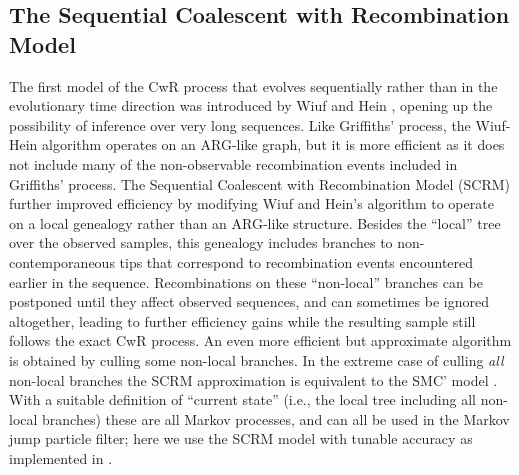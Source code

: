 \subsection{The Sequential Coalescent with Recombination Model} \label{scrm}

The first model of the CwR process that evolves sequentially rather than
in the evolutionary time direction was introduced by Wiuf and Hein \cite{C1999},
opening up the possibility of inference over very long sequences.
Like Griffiths' process, the Wiuf-Hein algorithm operates on an
ARG-like graph, but it is more efficient as it does not include many
of the non-observable recombination events included in Griffiths' process.
The Sequential Coalescent with Recombination Model (SCRM) \cite{Staab2015}
further improved efficiency by
modifying Wiuf and Hein's algorithm to operate on a local genealogy
rather than an ARG-like structure.
Besides the ``local'' tree over the observed samples, this genealogy includes
branches to non-contemporaneous tips that correspond to recombination
events encountered earlier in the sequence.  Recombinations on these
``non-local'' branches can be postponed until they affect observed sequences,
and can sometimes be ignored altogether, leading to further efficiency gains
while the resulting sample still follows the exact CwR process. An even
more efficient but approximate algorithm is obtained by culling some
non-local branches.  In the extreme case of culling \emph{all}
non-local branches the SCRM approximation is equivalent to the
SMC' model \cite{McVean2005,Marjoram2006}.
With a suitable definition of ``current state'' (i.e., the local tree
including all non-local branches) these are all Markov processes, and can all be
used in the Markov jump particle filter; here we use the SCRM model with tunable accuracy
as implemented in \cite{Staab2015}.

